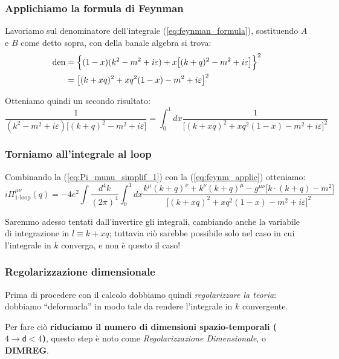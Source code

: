 \documentclass[../main.tex]{subfiles}
\begin{document}
\subsubsection{Applichiamo la formula di Feynman}
Lavoriamo sul denominatore dell'integrale (\ref{eq:feynman_formula}), sostituendo $A$ e $B$ come detto sopra, con della banale algebra si trova:
\begin{align*}
\text{den} & = \Bigl\{ (1-x)(k^2-m^2+i\varepsilon) + x\bigl[(k+q)^2 - m^2 +i\varepsilon\bigr] \Bigr\}^2 \\
    & = \bigl[(k+xq)^2 + xq^2(1-x) - m^2 + i\varepsilon \bigr]^2 
\end{align*}

Otteniamo quindi un secondo risultato:
\begin{equation}
    \frac{1}{(k^2-m^2+i\varepsilon)\bigl[(k+q)^2 - m^2 +i\varepsilon\bigr]} = \int_0^1dx\frac{1}{\bigl[(k+xq)^2 + xq^2(1-x) - m^2 + i\varepsilon\bigr]^2}
    \label{eq:feynm_applic}
\end{equation}

\subsubsection{Torniamo all'integrale al loop}

Combinando la (\ref{eq:Pi_munu_simplif_1}) con la (\ref{eq:feynm_applic}) otteniamo:
\begin{equation}
    i\Pi^{\mu\nu}_{\text{1-loop}}(q) = - 4e^2\int \frac{d^4k}{(2\pi)^4}\int_0^1dx \frac{ k^\mu(k + q)^\nu + k^\nu(k + q)^\mu - g^{\mu\nu}\bigl[k\cdot(k+q) - m^2\bigr]}{\bigl[(k+xq)^2 + xq^2(1-x) - m^2 + i\varepsilon\bigr]^2} 
    \label{eq:Pi_munu_simplif_2}
\end{equation}

Saremmo adesso tentati dall'invertire gli integrali, cambiando anche la variabile di integrazione in $l\equiv k+xq$; tuttavia ciò sarebbe possibile solo nel caso in cui l'integrale in $k$ converga, e non è questo il caso!

\subsubsection{Regolarizzazione dimensionale}
Prima di procedere con il calcolo dobbiamo quindi \textit{regolarizzare la teoria}: dobbiamo “deformarla” in modo tale da rendere l'integrale in $k$ convergente.

Per fare ciò \textbf{riduciamo il numero di dimensioni spazio-temporali ($4\rightarrow\mathsf d < 4$)}, questo step è noto come \textit{Regolarizzazione Dimensionale}, o \textbf{DIMREG}.
\end{document}

